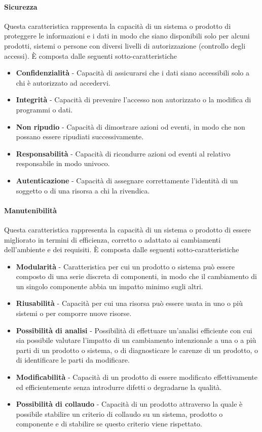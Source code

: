 \documentclass[../main.tex]{subfiles}
\begin{document}
\paragraph{Sicurezza}
Questa caratteristica rappresenta la capacità di un sistema o prodotto di proteggere le informazioni e i dati in modo che siano disponibili solo per alcuni prodotti, sistemi o persone con diversi livelli di autorizzazione (controllo degli accessi).
È composta dalle seguenti sotto-caratteristiche
\begin{itemize}
\item \textbf{Confidenzialità} - Capacità di assicurarsi che i dati siano accessibili solo a chi è autorizzato ad accedervi.
\item \textbf{Integrità} - Capacità di prevenire l'accesso non autorizzato o la modifica di programmi o dati.
\item \textbf{Non ripudio} - Capacità di dimostrare azioni od eventi, in modo che non possano essere ripudiati successivamente.
\item \textbf{Responsabilità} - Capacità di ricondurre azioni od eventi al relativo responsabile in modo univoco.
\item \textbf{Autenticazione} - Capacità di assegnare correttamente l'identità di un soggetto o di una risorsa a chi la rivendica.
\end{itemize}


\paragraph{Manutenibilità}
Questa caratteristica rappresenta la capacità di un sistema o prodotto di essere migliorato in termini di efficienza, corretto o adattato ai cambiamenti dell'ambiente e dei requisiti.
È composta dalle seguenti sotto-caratteristiche
\begin{itemize}
\item \textbf{Modularità} - Caratteristica per cui un prodotto o sistema può essere composto di una serie discreta di componenti, in modo che il cambiamento di un singolo componente abbia un impatto minimo sugli altri. 
\item \textbf{Riusabilità} - Capacità per cui una risorsa può essere usata in uno o più sistemi o per comporre nuove risorse.
\item \textbf{Possibilità di analisi} - Possibilità di effettuare un'analisi efficiente con cui sia possibile valutare l'impatto di un cambiamento intenzionale a una o a più parti di un prodotto o sistema, o di diagnosticare le carenze di un prodotto, o di identificare le parti da modificare.
\item \textbf{Modificabilità} - Capacità di un prodotto di essere modificato effettivamente ed efficientemente senza introdurre difetti o degradarne la qualità.
\item \textbf{Possibilità di collaudo} - Capacità di un prodotto attraverso la quale è possibile stabilire un criterio di collaudo su un sistema, prodotto o componente e di stabilire se questo criterio viene rispettato.
\end{itemize}
\end{document}
